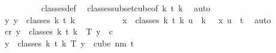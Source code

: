\begin{isabellebody}
\ \ \ \ \ \ \ \ \isamarkupfalse%
\ classes{\isacharunderscore}{\kern0pt}def\ \isamarkupfalse%
\ classes{\isacharunderscore}{\kern0pt}subset{\isacharunderscore}{\kern0pt}cube{\isacharbrackleft}{\kern0pt}of\ {\isachardoublequoteopen}k{\isacharplus}{\kern0pt}{}{\isachardoublequoteclose}\ t\ {\isachardoublequoteopen}k{\isacharplus}{\kern0pt}{}{\isachardoublequoteclose}{\isacharbrackright}{\kern0pt}\ \isamarkupfalse%
\ auto\isanewline
\ \ \ \ \ \ \isamarkupfalse%
\ \isamarkupfalse%
\ {\isachardoublequoteopen}{\isasymexists}{\isacharbang}{\kern0pt}y{\isachardot}{\kern0pt}\ y\ {\isasymin}\ classes\ {\isacharparenleft}{\kern0pt}k{\isacharplus}{\kern0pt}{}{\isacharparenright}{\kern0pt}\ t\ {\isacharparenleft}{\kern0pt}k{\isacharplus}{\kern0pt}{}{\isacharparenright}{\kern0pt}{\isachardoublequoteclose}\ \isanewline
\ \ \ \ \ \ \ \ \isamarkupfalse%
\ {\isacartoucheopen}{\isasymforall}x\ {\isasymin}\ classes\ {\isacharparenleft}{\kern0pt}k{\isacharplus}{\kern0pt}{}{\isacharparenright}{\kern0pt}\ t\ {\isacharparenleft}{\kern0pt}k{\isacharplus}{\kern0pt}{}{\isacharparenright}{\kern0pt}{\isachardot}{\kern0pt}\ {\isasymforall}u\ {\isacharless}{\kern0pt}\ k\ {\isacharplus}{\kern0pt}\ {}{\isachardot}{\kern0pt}\ x\ u\ {\isacharequal}{\kern0pt}\ t{\isacartoucheclose}\ \isamarkupfalse%
\ auto\isanewline
\ \ \ \ \ \ \isamarkupfalse%
\ {\isachardoublequoteopen}{\isasymexists}c{\isacharless}{\kern0pt}r{\isachardot}{\kern0pt}\ {\isasymforall}y\ {\isasymin}\ classes\ {\isacharparenleft}{\kern0pt}k{\isacharplus}{\kern0pt}{}{\isacharparenright}{\kern0pt}\ t\ {\isacharparenleft}{\kern0pt}k{\isacharplus}{\kern0pt}{}{\isacharparenright}{\kern0pt}{\isachardot}{\kern0pt}\ {\isasymchi}\ {\isacharparenleft}{\kern0pt}T\ y{\isacharparenright}{\kern0pt}\ {\isacharequal}{\kern0pt}\ c{\isachardoublequoteclose}\ \isanewline
\ \ \ \ \ \ \isamarkupfalse%
\ {\isacharminus}{\kern0pt}\isanewline
\ \ \ \ \ \ \ \ \isamarkupfalse%
\ {\isachardoublequoteopen}{\isasymforall}y\ {\isasymin}\ classes\ {\isacharparenleft}{\kern0pt}k{\isacharplus}{\kern0pt}{}{\isacharparenright}{\kern0pt}\ t\ {\isacharparenleft}{\kern0pt}k{\isacharplus}{\kern0pt}{}{\isacharparenright}{\kern0pt}{\isachardot}{\kern0pt}\ T\ y\ {\isasymin}\ cube\ {\isacharparenleft}{\kern0pt}n{\isacharplus}{\kern0pt}m{\isacharparenright}{\kern0pt}\ {\isacharparenleft}{\kern0pt}t{\isacharplus}{\kern0pt}{}{\isacharparenright}{\kern0pt}{\isachardoublequoteclose}\ \isamarkupfalse%

\end{isabellebody}
